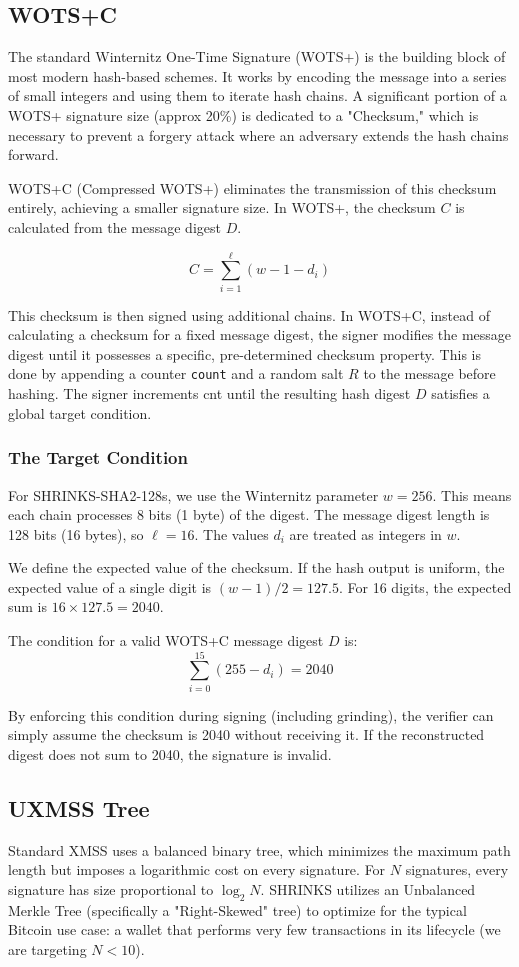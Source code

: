 \subsection{WOTS+C}
The standard Winternitz One-Time Signature (WOTS+) is the building block of most modern hash-based 
schemes. It works by encoding the message into a series of small integers and using them to iterate 
hash chains. A significant portion of a WOTS+ signature size (approx 20\%) is dedicated to a 
"Checksum," which is necessary to prevent a forgery attack where an adversary extends the hash 
chains forward.

WOTS+C (Compressed WOTS+) eliminates the transmission of this checksum entirely, achieving a smaller 
signature size. In WOTS+, the checksum $C$ is calculated from the message digest $D$.

$$C = \sum_{i=1}^{\ell} (w - 1 - d_i)$$

This checksum is then signed using additional chains. In WOTS+C, instead of calculating a checksum 
for a fixed message digest, the signer modifies the message digest until it possesses a specific, 
pre-determined checksum property. This is done by appending a counter \texttt{count} and a random 
salt $R$ to the message before hashing. The signer increments cnt until the resulting hash digest 
$D$ satisfies a global target condition.

\subsubsection{The Target Condition}
For SHRINKS-SHA2-128s, we use the Winternitz parameter $w=256$. This means each chain processes 8 
bits (1 byte) of the digest. The message digest length is 128 bits (16 bytes), so $\ell = 16$. The 
values $d_i$ are treated as integers in $w$.

We define the expected value of the checksum. If the hash output is uniform, the expected value of a 
single digit is $(w-1)/2 = 127.5$. For 16 digits, the expected sum is $16 \times 127.5 = 2040$.

The condition for a valid WOTS+C message digest $D$ is:
$$\sum_{i=0}^{15} (255 - d_i) = 2040$$

By enforcing this condition during signing (including grinding), the verifier can simply assume 
the checksum is 2040 without receiving it. If the reconstructed digest does not sum to 2040, the 
signature is invalid. 

\subsection{UXMSS Tree}
Standard XMSS uses a balanced binary tree, which minimizes the maximum path length but imposes a 
logarithmic cost on every signature. For $N$ signatures, every signature has size proportional to 
$\log_2 N$. SHRINKS utilizes an Unbalanced Merkle Tree (specifically a "Right-Skewed" tree) to 
optimize for the typical Bitcoin use case: a wallet that performs very few transactions in its 
lifecycle (we are targeting $N < 10$).

